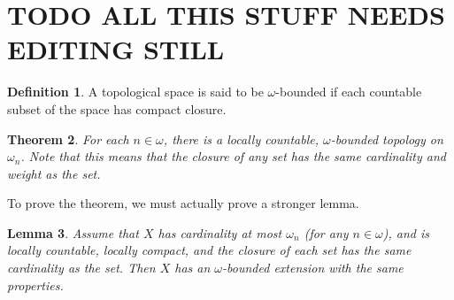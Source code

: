 \documentclass{amsart}
\theoremstyle{plain}
\newtheorem{theorem}{Theorem}
\newtheorem{lemma}[theorem]{Lemma}
\theoremstyle{definition}
\newtheorem{definition}[theorem]{Definition}
\theoremstyle{remark}
\theoremstyle{plain}
\theoremstyle{definition}
\theoremstyle{remark}
\begin{document}
  \newpage

  \section{TODO ALL THIS STUFF NEEDS EDITING STILL}

  \begin{definition}
    A topological space is said to be \(\omega\)-bounded if each countable
    subset of the space has compact closure.
  \end{definition}


          \begin{theorem}
           For each $n\in \omega$, there is a locally countable,
            $\omega$-bounded topology on $\omega_n$. Note
            that this means that the closure of any set has
            the same cardinality and weight as the set.
          \end{theorem}


          To prove the theorem, we must actually prove a stronger lemma.

          \begin{lemma}
          Assume that $X$ has cardinality at most $\omega_n$ (for
          any $n\in \omega$),
          and is locally countable, locally compact, and the closure
          of each set has the same cardinality as the set.
          Then $X$ has an $\omega$-bounded extension with the
          same properties.
          \end{lemma}
\end{document}
